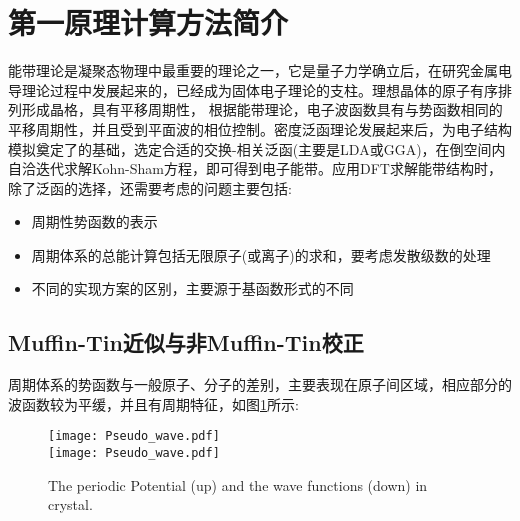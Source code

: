 \section{第一原理计算方法简介}
能带理论是凝聚态物理中最重要的理论之一，它是量子力学确立后，在研究金属电导理论过程中发展起来的，已经成为固体电子理论的支柱。理想晶体的原子有序排列形成晶格，具有平移周期性，%
根据能带理论，电子波函数具有与势函数相同的平移周期性，并且受到平面波的相位控制。密度泛函理论发展起来后，为电子结构模拟奠定了的基础，选定合适的交换-相关泛函(主要是LDA或GGA)，在倒空间内自洽迭代求解Kohn-Sham方程，即可得到电子能带。应用DFT求解能带结构时，除了泛函的选择，还需要考虑的问题主要包括:
\begin{itemize}
	\item 周期性势函数的表示
	\item 周期体系的总能计算包括无限原子(或离子)的求和，要考虑发散级数的处理
	\item 不同的实现方案的区别，主要源于基函数形式的不同
\end{itemize}

\subsection{Muffin-Tin近似与非Muffin-Tin校正}
周期体系的势函数与一般原子、分子的差别，主要表现在原子间区域，相应部分的波函数较为平缓，并且有周期特征，如图\ref{Potential-Wave}所示:
\begin{figure}[h!]
\centering
\texttt{[image: Pseudo\_wave.pdf]}\\
\texttt{[image: Pseudo\_wave.pdf]}
\caption{\small \textrm{The periodic Potential (up) and the wave functions (down) in crystal.}}%
\label{Potential-Wave}
\end{figure}

